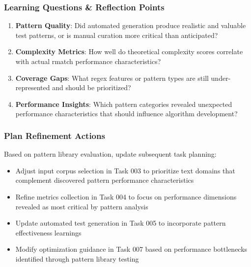\documentclass[11pt,a4paper]{article}
\begin{document}
\subsubsection{Learning Questions \& Reflection Points}
\begin{enumerate}
    \item \textbf{Pattern Quality}: Did automated generation produce realistic and valuable test patterns, or is manual curation more critical than anticipated?
    \item \textbf{Complexity Metrics}: How well do theoretical complexity scores correlate with actual rmatch performance characteristics?
    \item \textbf{Coverage Gaps}: What regex features or pattern types are still under-represented and should be prioritized?
    \item \textbf{Performance Insights}: Which pattern categories revealed unexpected performance characteristics that should influence algorithm development?
\end{enumerate}

\subsubsection{Plan Refinement Actions}
Based on pattern library evaluation, update subsequent task planning:
\begin{itemize}
    \item Adjust input corpus selection in Task 003 to prioritize text domains that complement discovered pattern performance characteristics
    \item Refine metrics collection in Task 004 to focus on performance dimensions revealed as most critical by pattern analysis
    \item Update automated test generation in Task 005 to incorporate pattern effectiveness learnings
    \item Modify optimization guidance in Task 007 based on performance bottlenecks identified through pattern library testing
\end{itemize}

\end{document}
